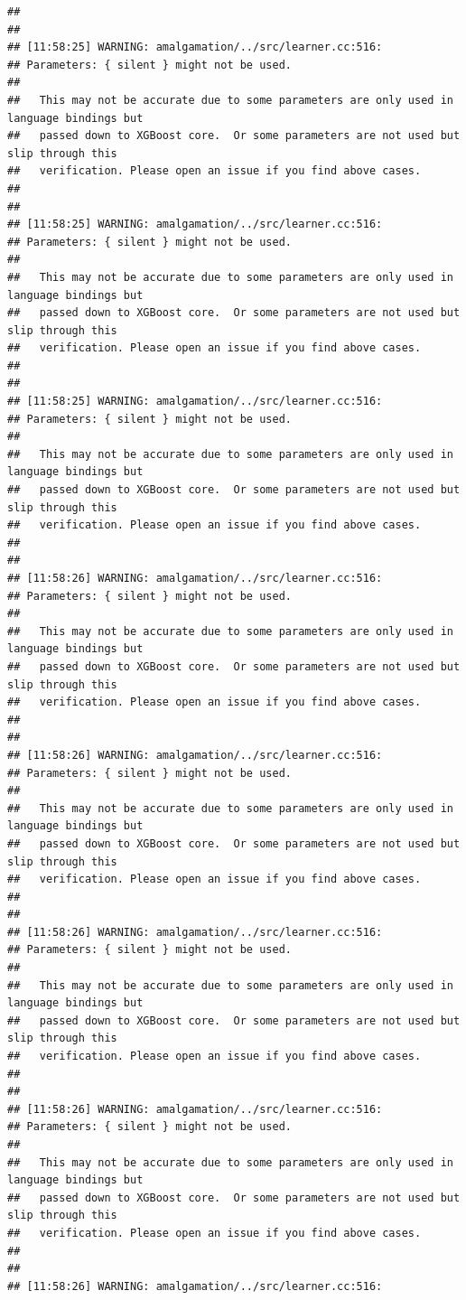 \documentclass[AMS,STIX2COL]{WileyNJD-v2}\usepackage[]{graphicx}\usepackage[]{color}
\makeatletter
\newenvironment{kframe}{%
 \def\at@end@of@kframe{}%
 \ifinner\ifhmode%
  \def\at@end@of@kframe{\end{minipage}}%
  \begin{minipage}{\columnwidth}%
 \fi\fi%
 \def\FrameCommand##1{\hskip\@totalleftmargin \hskip-\fboxsep
 \colorbox{shadecolor}{##1}\hskip-\fboxsep
     \hskip-\linewidth \hskip-\@totalleftmargin \hskip\columnwidth}%
 \MakeFramed {\advance\hsize-\width
   \@totalleftmargin\z@ \linewidth\hsize
   \@setminipage}}%
 {\par\unskip\endMakeFramed%
 \at@end@of@kframe}
\newenvironment{knitrout}{}{} %
\makeatother
\begin{document}
\begin{knitrout}
\begin{kframe}
\begin{verbatim}
## 
## 
## [11:58:25] WARNING: amalgamation/../src/learner.cc:516: 
## Parameters: { silent } might not be used.
## 
##   This may not be accurate due to some parameters are only used in language bindings but
##   passed down to XGBoost core.  Or some parameters are not used but slip through this
##   verification. Please open an issue if you find above cases.
## 
## 
## [11:58:25] WARNING: amalgamation/../src/learner.cc:516: 
## Parameters: { silent } might not be used.
## 
##   This may not be accurate due to some parameters are only used in language bindings but
##   passed down to XGBoost core.  Or some parameters are not used but slip through this
##   verification. Please open an issue if you find above cases.
## 
## 
## [11:58:25] WARNING: amalgamation/../src/learner.cc:516: 
## Parameters: { silent } might not be used.
## 
##   This may not be accurate due to some parameters are only used in language bindings but
##   passed down to XGBoost core.  Or some parameters are not used but slip through this
##   verification. Please open an issue if you find above cases.
## 
## 
## [11:58:26] WARNING: amalgamation/../src/learner.cc:516: 
## Parameters: { silent } might not be used.
## 
##   This may not be accurate due to some parameters are only used in language bindings but
##   passed down to XGBoost core.  Or some parameters are not used but slip through this
##   verification. Please open an issue if you find above cases.
## 
## 
## [11:58:26] WARNING: amalgamation/../src/learner.cc:516: 
## Parameters: { silent } might not be used.
## 
##   This may not be accurate due to some parameters are only used in language bindings but
##   passed down to XGBoost core.  Or some parameters are not used but slip through this
##   verification. Please open an issue if you find above cases.
## 
## 
## [11:58:26] WARNING: amalgamation/../src/learner.cc:516: 
## Parameters: { silent } might not be used.
## 
##   This may not be accurate due to some parameters are only used in language bindings but
##   passed down to XGBoost core.  Or some parameters are not used but slip through this
##   verification. Please open an issue if you find above cases.
## 
## 
## [11:58:26] WARNING: amalgamation/../src/learner.cc:516: 
## Parameters: { silent } might not be used.
## 
##   This may not be accurate due to some parameters are only used in language bindings but
##   passed down to XGBoost core.  Or some parameters are not used but slip through this
##   verification. Please open an issue if you find above cases.
## 
## 
## [11:58:26] WARNING: amalgamation/../src/learner.cc:516: 

\end{verbatim}
\end{kframe}
\end{knitrout}
\end{document}

